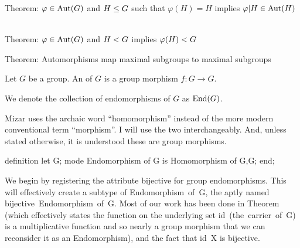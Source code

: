 \LA{}Theorem: $\varphi\in\operatorname{Aut}(G)$ and $H\leq G$ such that $\varphi(H)=H$ implies $\varphi|H\in\operatorname{Aut}(H)$~{\nwtagstyle{}}\RA{}

\LA{}Theorem: $\varphi\in\operatorname{Aut}(G)$ and $H< G$ implies $\varphi(H)< G$~{\nwtagstyle{}}\RA{}

\LA{}Theorem: Automorphisms map maximal subgroups to maximal subgroups~{\nwtagstyle{}}\RA{}
\nwendcode{}\nwdocspar

\begin{definition*}
Let $G$ be a group. An  of $G$ is a group morphism
$f\colon G\to G$.
\end{definition*}

\begin{remark}
We denote the collection of endomorphisms of $G$ as $\operatorname{End}(G)$.
\end{remark}

\begin{remark}
Mizar uses the archaic word ``homomorphism'' instead of the more modern
conventional term ``morphism''. I will use the two interchangeably. And,
unless stated otherwise, it is understood these are group morphisms.
\end{remark}

\nwenddocs{}\endmoddef\nwstartdeflinemarkup{}\nwenddeflinemarkup
definition
  let G;
  mode Endomorphism of G is Homomorphism of G,G;
end;
\eatline
{}\nwendcode{}\nwdocspar
\begin{registration}\label{par:characteristic:register-bijective-for-endomorphism}
We begin by registering the attribute {\Tt{}bijective\nwendquote} for group
endomorphisms. This will effectively create a subtype of {\Tt{}Endomorphism\ of\ G\nwendquote},
the aptly named {\Tt{}bijective\ Endomorphism\ of\ G\nwendquote}. Most of our work has
been done in Theorem~
(which effectively states the function on the underlying set
{\Tt{}id\ (the\ carrier\ of\ G)\nwendquote} is a multiplicative function and so nearly a
group morphism that we can reconsider it as an {\Tt{}Endomorphism\nwendquote}), and
the fact that {\Tt{}id\ X\nwendquote} is bijective.
\end{registration}

